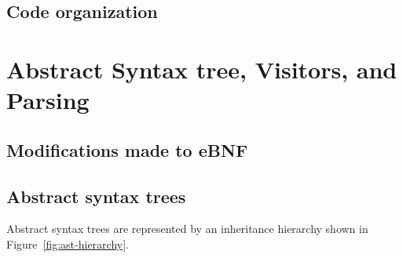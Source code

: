 \documentclass[11pt,a4paper]{scrartcl}
\begin{document}
\subsection{Code organization}

\newpage

\section{Abstract Syntax tree, Visitors, and Parsing}

\subsection{Modifications made to eBNF}


\subsection{Abstract syntax trees}

Abstract syntax trees are represented by an inheritance hierarchy shown in Figure~\ref{fig:ast-hierarchy}.
\end{document}
